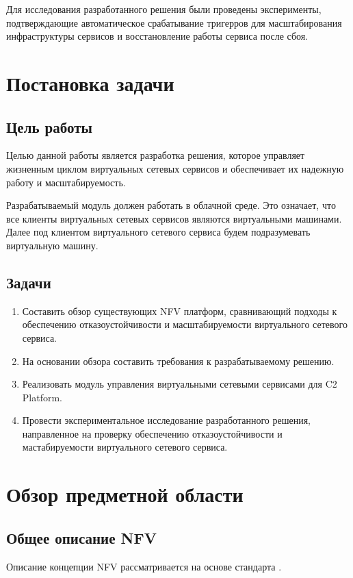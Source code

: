\documentclass[oneside,final,14pt,a4paper]{extreport}
\begin{document}
Для исследования разработанного решения были проведены эксперименты, подтверждающие автоматическое срабатывание тригерров для масштабирования инфраструктуры сервисов и восстановление работы сервиса после сбоя.





\chapter{Постановка задачи}
\label{chap:problem_statement}
\section{Цель работы}
Целью данной работы является разработка решения, которое управляет жизненным циклом виртуальных сетевых сервисов и обеспечивает их надежную работу и масштабируемость.

Разрабатываемый модуль должен работать в облачной среде. Это означает, что все клиенты виртуальных сетевых сервисов являются виртуальными машинами. Далее под клиентом виртуального сетевого сервиса будем подразумевать виртуальную машину.

\section{Задачи}
\begin{enumerate}
	\item Составить обзор существующих NFV платформ, сравнивающий подходы к обеспечению отказоустойчивости и масштабируемости виртуального сетевого сервиса.
	\item На основании обзора составить требования к разрабатываемому решению.
	\item Реализовать модуль управления виртуальными сетевыми сервисами для C2 Platform.
	\item Провести экспериментальное исследование разработанного решения, направленное на проверку обеспечению отказоустойчивости и мастабируемости виртуального сетевого сервиса.
\end{enumerate}




\chapter{Обзор предметной области}
\label{chap:overview_subject_area}

\section{Общее описание NFV}
\label{sec:nfv_description}
Описание концепции NFV рассматривается на основе стандарта \cite{nfv-official}.
\end{document}
